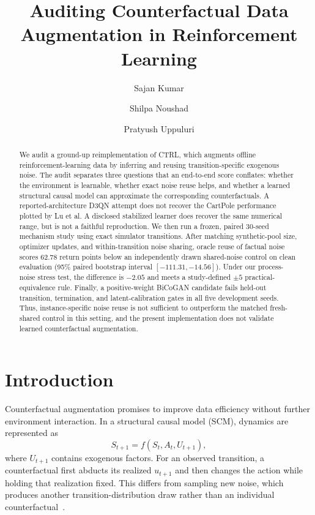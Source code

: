 \documentclass[runningheads]{llncs}
\begin{document}
\title{Auditing Counterfactual Data Augmentation in Reinforcement Learning}

\author{Sajan Kumar \and Shilpa Noushad \and Pratyush Uppuluri}

\maketitle

\begin{abstract}
We audit a ground-up reimplementation of CTRL, which augments offline
reinforcement-learning data by inferring and reusing transition-specific
exogenous noise. The audit separates three questions that an end-to-end score
conflates: whether the environment is learnable, whether exact noise reuse helps,
and whether a learned structural causal model can approximate the corresponding
counterfactuals. A reported-architecture D3QN attempt does not recover the CartPole
performance plotted by Lu et al. A disclosed stabilized learner does recover the
same numerical range, but is not a faithful reproduction. We then run a frozen,
paired 30-seed mechanism study using exact simulator transitions. After matching
synthetic-pool size, optimizer updates, and within-transition noise sharing,
oracle reuse of factual noise scores 62.78 return points below an independently
drawn shared-noise control on clean evaluation (95\% paired bootstrap interval
$[-111.31,-14.56]$). Under our process-noise stress test, the difference is
$-2.05$ and meets a study-defined $\pm5$ practical-equivalence rule. Finally, a
positive-weight BiCoGAN candidate fails held-out transition, termination, and
latent-calibration gates in all five development seeds. Thus, instance-specific
noise reuse is not sufficient to outperform the matched fresh-shared control in
this setting, and the
present implementation does not validate learned counterfactual augmentation.
\end{abstract}

\section{Introduction}

Counterfactual augmentation promises to improve data efficiency without further
environment interaction. In a structural causal model (SCM), dynamics are
represented as
\begin{equation}
S_{t+1}=f(S_t,A_t,U_{t+1}),
\label{eq:scm}
\end{equation}
where $U_{t+1}$ contains exogenous factors. For an observed transition, a
counterfactual first abducts its realized $u_{t+1}$ and then changes the action
while holding that realization fixed. This differs from sampling new noise,
which produces another transition-distribution draw rather than an individual
counterfactual~\cite{pearl2009causality,buesing2019cfgps}.
\end{document}

